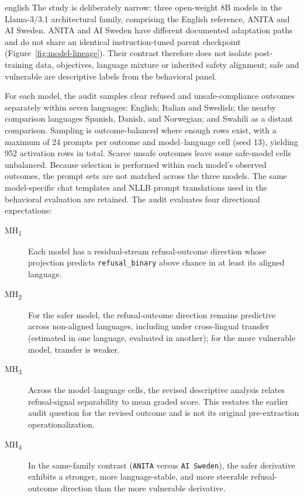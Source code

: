 \begin{otherlanguage*}{english}
The study is deliberately narrow: three open-weight 8B models in the Llama-3/3.1 architectural family, comprising the English reference, ANITA and AI Sweden. ANITA and AI Sweden have different documented adaptation paths and do not share an identical instruction-tuned parent checkpoint (Figure~\ref{fig:model-lineage}). Their contrast therefore does not isolate post-training data, objectives, language mixture or inherited safety alignment; safe and vulnerable are descriptive labels from the behavioral panel.

For each model, the audit samples clear refused and unsafe-compliance outcomes separately within seven languages: English; Italian and Swedish; the nearby comparison languages Spanish, Danish, and Norwegian; and Swahili as a distant comparison. Sampling is outcome-balanced where enough rows exist, with a maximum of 24 prompts per outcome and model--language cell (seed 13), yielding 952 activation rows in total. Scarce unsafe outcomes leave some safe-model cells unbalanced. Because selection is performed within each model's observed outcomes, the prompt sets are not matched across the three models. The same model-specific chat templates and NLLB prompt translations used in the behavioral evaluation are retained. The audit evaluates four directional expectations:

\begin{description}
    \item[MH\textsubscript{1}] Each model has a residual-stream refusal-outcome direction whose projection predicts \texttt{refusal\_binary} above chance in at least its aligned language.
    \item[MH\textsubscript{2}] For the safer model, the refusal-outcome direction remains predictive across non-aligned languages, including under cross-lingual transfer (estimated in one language, evaluated in another); for the more vulnerable model, transfer is weaker.
    \item[MH\textsubscript{3}] Across the model--language cells, the revised descriptive analysis relates refusal-signal separability to mean graded score. This restates the earlier audit question for the revised outcome and is not its original pre-extraction operationalization.
    \item[MH\textsubscript{4}] In the same-family contrast (\texttt{ANITA} versus \texttt{AI Sweden}), the safer derivative exhibits a stronger, more language-stable, and more steerable refusal-outcome direction than the more vulnerable derivative.
\end{description}


\end{otherlanguage*}
